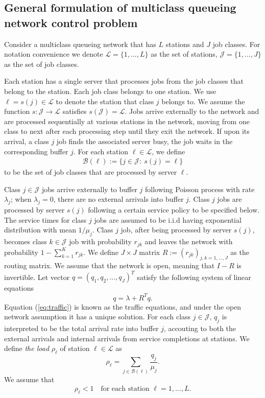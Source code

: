 \documentclass[11pt]{article}
\newcommand{\B}{\mathcal{B}}
\newcommand{\LL}{\mathcal{L}}
\newcommand{\J}{\mathcal{J}}
\theoremstyle{definition}
\numberwithin{equation}{section}
\begin{document}
\subsection{General formulation of  multiclass queueing network control problem}


Consider a multiclass queueing network that has $L$ stations  and $ J$  job classes.   For
notation convenience we denote $\LL = \{1, ..., L\}$ as  the set
  of stations, $\J = \{1, ...,J \}$ as  the  set of
job classes.

Each station has a single server that
processes jobs from the job classes that belong   to the station.  Each job class belongs to one  station. We use
$\ell= s(j)\in \LL$ to denote the station that class $j$ belongs to.
We assume the function $s: \J \to \LL$ satisfies $s(\J)=\LL$.
Jobs arrive externally to the network and are processed sequentially at various stations in the network, moving from one class to next after each processing step until they exit the network.
If upon its arrival, a class $j$ job finds the  associated server busy, the job waits in the corresponding buffer $j$.
For each station $\ell\in \LL$, we define
  \begin{align}\label{def:servers}
 \mathcal{B}(\ell) := \{j\in \J:~ s(j)  = \ell\}
 \end{align} to be the set of job classes  that are processed by
 server $\ell$.

Class $j\in \J$ jobs arrive externally to buffer $j$ following Poisson
 process with rate $\lambda_j$; when $\lambda_j=0$, there are no external arrivals into buffer $j$.
   Class $j$ jobs are processed
 by server $s(j)$ following a certain service policy to be specified
 below.
 The service times for class $j$ jobs are assumed to be
 i.i.d  having exponential distribution with  mean $1/\mu_j$. Class $j$
 job, after being processed by server $s(j)$, becomes class $k\in \J$ job with probability $r_{jk}$ and leaves the network with probability
  $1 - \sum\limits_{k=1}^K r_{jk}$. We define $J\times J$ matrix $R := (r_{jk})_{j,k=1,..., J}$ as the routing matrix. We assume that the network is open, meaning that $I-R$ is invertible.
 Let vector $q= (q_1, q_2, ..., q_J)^T$ satisfy the following system of linear
equations
\begin{equation}\label{eq:traffic}
  q = \lambda +R^T q.
\end{equation}
Equation (\ref{eq:traffic}) is known as
  the traffic equations, and under the open network assumption it has a unique solution.
  For each class $j \in \J$,  $q_j$ is interpreted to be the total arrival rate
  into buffer $j$,  accouting to both the  external arrivals
  and internal arrivals from service completions at stations.
We define \textit{the load} $\rho_\ell$ of station $\ell\in\LL$ as
\begin{equation*}\rho_\ell = \sum\limits_{j\in \B(\ell)} \frac{q_j}{\mu_j}.\end{equation*}
We assume that
\begin{align}\label{eq:load}
\rho_\ell<1 \quad \text{for each  station }\ell= 1, ..., L.
\end{align}
\end{document}
